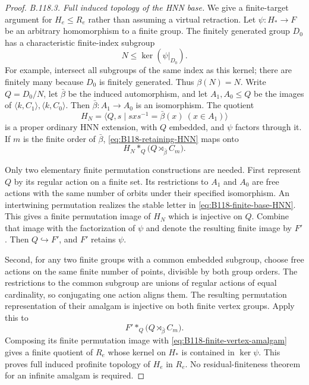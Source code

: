 \begin{proof}
\emph{B.118.3. Full induced topology of the HNN base.}
We give a finite-target argument for $H_e\leq R_e$ rather than
assuming a virtual retraction. Let $\psi:H_*\to F$ be an arbitrary
homomorphism to a finite group. The finitely generated group $D_0$
has a characteristic finite-index subgroup
\[
 N\leq\ker(\psi|_{D_0}).
\]
For example, intersect all subgroups of the same index as this kernel;
there are finitely many because $D_0$ is finitely generated.
Thus $\beta(N)=N$. Write $Q=D_0/N$, let $\bar\beta$ be the
induced automorphism, and let $A_1,A_0\leq Q$ be the images of
$\langle k,C_1\rangle,\langle k,C_0\rangle$. Then
$\bar\beta:A_1\to A_0$ is an isomorphism. The quotient
\begin{equation}\label{eq:B118-finite-base-HNN}
 H_N=\langle Q,s\mid s x s^{-1}=\bar\beta(x)\ (x\in A_1)\rangle
\end{equation}
is a proper ordinary HNN extension, with $Q$ embedded, and $\psi$
factors through it. If $m$ is the finite order of $\bar\beta$,
\eqref{eq:B118-retaining-HNN} maps onto
\begin{equation}\label{eq:B118-finite-vertex-amalgam}
 H_N *_{Q}\bigl(Q\rtimes_{\bar\beta}C_m\bigr).
\end{equation}

Only two elementary finite permutation constructions are needed.
First represent $Q$ by its regular action on a finite set. Its
restrictions to $A_1$ and $A_0$ are free actions with the same number
of orbits under their specified isomorphism. An intertwining
permutation realizes the stable letter in
\eqref{eq:B118-finite-base-HNN}. This gives a finite permutation
image of $H_N$ which is injective on $Q$. Combine that image with
the factorization of $\psi$ and denote the resulting finite image
by $F'$. Then $Q\hookrightarrow F'$, and $F'$ retains $\psi$.

Second, for any two finite groups with a common embedded subgroup,
choose free actions on the same finite number of points, divisible
by both group orders. The restrictions to the common subgroup are
unions of regular actions of equal cardinality, so conjugating one
action aligns them. The resulting permutation representation of
their amalgam is injective on both finite vertex groups. Apply this
to
\[
 F' *_{Q}\bigl(Q\rtimes_{\bar\beta}C_m\bigr).
\]
Composing its finite permutation image with
\eqref{eq:B118-finite-vertex-amalgam} gives a finite quotient of
$R_e$ whose kernel on $H_*$ is contained in $\ker\psi$.
This proves full induced profinite topology of $H_e$ in $R_e$.
No residual-finiteness theorem for an infinite amalgam is required.


\end{proof}
